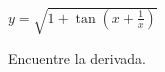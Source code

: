 \item $\displaystyle y = \sqrt{1 + \tan \left( x + \frac{1}{x} \right)}$
\par
Encuentre la derivada.
